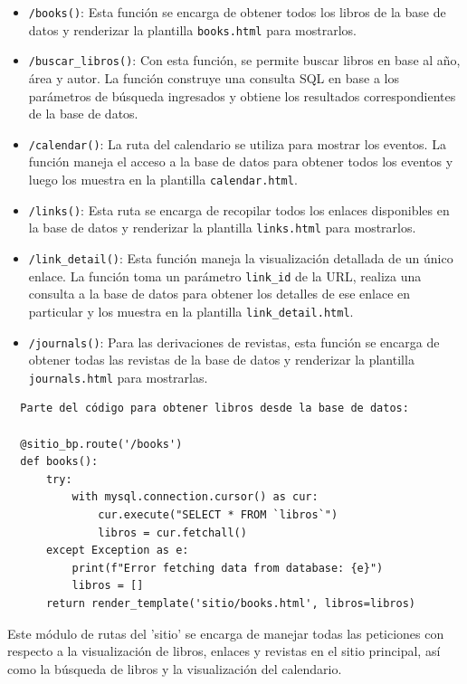 \documentclass[a4paper, 12pt]{book}
\begin{document}
\begin{itemize}
    \item \texttt{/books()}: Esta función se encarga de obtener todos los libros de la base de datos y renderizar la plantilla \texttt{books.html} para mostrarlos.
    \item \texttt{/buscar\_libros()}: Con esta función, se permite buscar libros en base al año, área y autor. La función construye una consulta SQL en base a los 
    parámetros de búsqueda ingresados y obtiene los resultados correspondientes de la base de datos.
    \item \texttt{/calendar()}: La ruta del calendario\cite{fullcalendar} se utiliza para mostrar los eventos. La función maneja el acceso a la base de datos para obtener todos los 
    eventos y luego los muestra en la plantilla \texttt{calendar.html}.
    \item \texttt{/links()}: Esta ruta se encarga de recopilar todos los enlaces disponibles en la base de datos y renderizar la plantilla \texttt{links.html} para mostrarlos.
    \item \texttt{/link\_detail()}: Esta función maneja la visualización detallada de un único enlace. La función toma un parámetro \texttt{link\_id} de la URL, 
    realiza una consulta a la base de datos para obtener los detalles de ese enlace en particular y los muestra en la plantilla \texttt{link\_detail.html}.
    \item \texttt{/journals()}: Para las derivaciones de revistas, esta función se encarga de obtener todas las revistas de la base de datos y renderizar la 
    plantilla \texttt{journals.html} para mostrarlas.
\end{itemize}

\begin{verbatim}
  Parte del código para obtener libros desde la base de datos:

  @sitio_bp.route('/books')
  def books():
      try:
          with mysql.connection.cursor() as cur:
              cur.execute("SELECT * FROM `libros`")
              libros = cur.fetchall()
      except Exception as e:
          print(f"Error fetching data from database: {e}")
          libros = []
      return render_template('sitio/books.html', libros=libros)
\end{verbatim}
Este módulo de rutas del 'sitio' se encarga de manejar todas las peticiones con respecto a la visualización de libros, enlaces y revistas en el sitio principal, así como la búsqueda de libros y la visualización del calendario.
\end{document}
